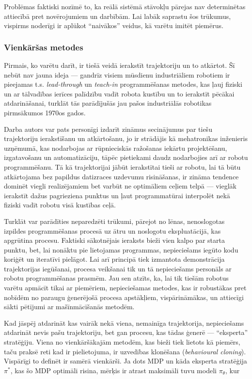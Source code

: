 \documentclass[12pt, a4paper]{article}
\numberwithin{equation}{section} %
\begin{document}
Problēmas faktiski nozīmē to, ka reālā sistēmā stāvokļu pārejas nav determinētas attiecībā pret novērojumiem un darbībām. Lai labāk saprastu šos trūkumus, vispirms noderīgi ir aplūkot ``naivākos'' veidus, kā varētu imitēt piemērus.

\subsubsection{Vienkāršas metodes}

Pirmais, ko varētu darīt, ir tiešā veidā ierakstīt trajektoriju un to atkārtot. Šī nebūt nav jauna ideja --- gandrīz visiem mūsdienu industriāliem robotiem ir pieejamas t.s. \textit{lead-through} un \textit{teach-in} programmēšanas metodes, kas ļauj fiziski un ar tālvadības ierīces palīdzību vadīt robota kustību un to ierakstīt pēcākai atdarināšanai\cite{teach_pendant}, turklāt tās parādījušās jau pašos industriālās robotikas pirmsākumos 1970os gados\cite{abb2016special}.

Darba autors var pats personīgi izdarīt zināmus secinājumus par tiešu trajektoriju ierakstīšanu un atkārtošanu, jo ir strādājis kā mehatronikas inženieris uzņēmumā, kas nodarbojas ar rūpnieciskās ražošanas iekārtu projektēšanu, izgatavošanu un automatizāciju, tāpēc pietiekami daudz nodarbojies arī ar robotu programmēšanu. Tā kā trajektorijai jābūt ierakstītai tieši ar robotu, lai tā būtu atkārtojama bez papildus datizraces uzdevumu risināšanas, ir zināma tendence dominēt viegli realizējamiem bet varbūt ne optimāliem ceļiem telpā --- vieglāk ierakstīt dažus pagrieziena punktus un ļaut programmatūrai interpolēt nekā fiziski vadīt robotu visā kustības ceļā. 

Turklāt var parādīties neparedzēti trūkumi, pārejot no lēnas, nenoslogotas izpildes programmēšanas procesā uz ātru un noslogotu ekspluatācijā, kas apgrūtina procesu. Faktiski sākotnējais ieraksts bieži vien kalpo par starta punktu, bet, lai nonāktu pie lietojamas programmas, nepieciešams iegūto kodu koriģēt un iteratīvi pielāgot. Lai arī principā tiek izmantota demonstrācija trajektorijas iegūšanai, procesa veikšanai tik un tā nepieciešams personāls ar robotu programmēšanas prasmēm. Jau sen atzīts\cite{muench1994robot,billard2008handbook}, ka, lai tik tiešām robotus varētu apmācīt tikai ar piemēriem, nepieciešamas metodes, kas ir robustākas pret nobīdēm no paraugu ģenerējošā procesa apstākļiem, vispārināmākas, un attiecīgi sākti pētījumi ar mašīnmācīšanās metodēm.

Kad jāspēj atdarināt kas vairāk nekā viena, nemainīga trajektorija, nepieciešams atdarināt nevis pašu trajektoriju, bet gan procesu, kas tādas ģenerē --- ``eksperta'' stratēģiju. Viena no vienkāršākajām metodēm, kas bieži tiek lietots kā piemērs, taču praksē reti kad ir pielietojuma, ir uzvedības klonēšana (\textit{behavioural cloning}). Vispārīgi to definēt ir samērā vienkārši\cite{attia2018global}. Ja dots MDP un kāda eksperta stratēģija $\pi^*$, kas šo MDP optimāli risina, mērķis ir atrast maksimāli tuvu modeli $\pi_{\theta}$, kur
\end{document}
